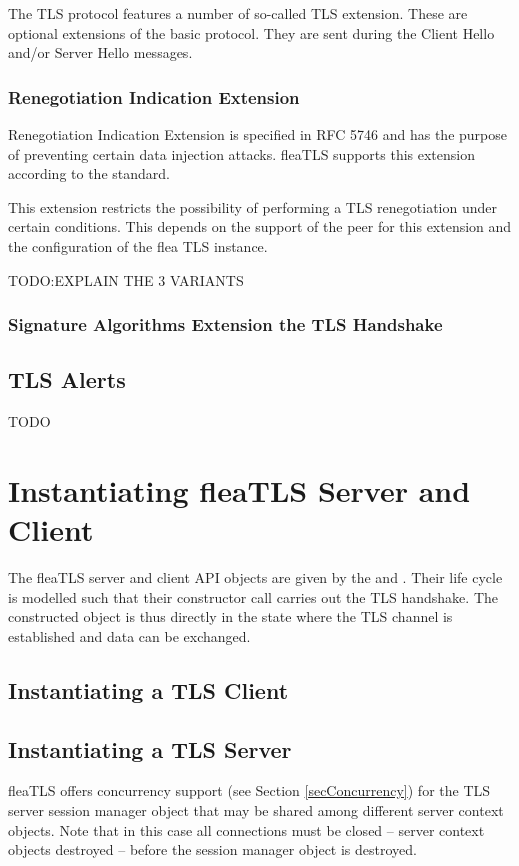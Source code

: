 \documentclass[a4paper,11pt]{scrartcl}
\begin{document}
The TLS protocol features a number of so-called TLS extension. These are
optional extensions of the basic protocol. They are sent during the Client Hello
and/or Server Hello messages. 
\subsubsection{Renegotiation Indication Extension}
Renegotiation Indication Extension is specified in RFC 5746 and has the purpose
of preventing certain data injection attacks. fleaTLS supports this extension
according to the standard.  

This extension restricts the possibility of performing a TLS renegotiation under
certain conditions. This depends on the support of the peer for this extension
and the configuration of the flea TLS instance. 

TODO:EXPLAIN THE 3 VARIANTS

\subsubsection{Signature Algorithms Extension the TLS Handshake}



\subsection{TLS Alerts}
TODO

\section{Instantiating fleaTLS Server and Client}

The fleaTLS server and client API objects are given by the
\serverCtx and \clientCtx. Their life cycle is modelled such that their
constructor call carries out the TLS handshake. The constructed object is thus
directly in the state where the TLS channel is established and data can be
exchanged.

\subsection{Instantiating a TLS Client}

\subsection{Instantiating a TLS Server}
\label{secTlsServer}
fleaTLS offers concurrency support (see Section \ref{secConcurrency}) for the TLS server session manager object
that may be shared among different server context objects. Note that in this
case all connections must be closed -- \ie server context objects destroyed -- before the session manager object is destroyed.
\end{document}
